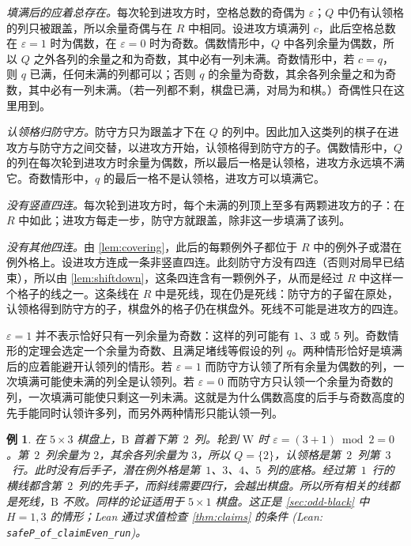 \documentclass[11pt,a4paper]{article}
\makeatletter
\theoremstyle{zhthm}
\newtheorem{example}[theorem]{例}
\renewcommand{\proofname}{证明}
\renewenvironment{proof}[1][\proofname]{\par\pushQED{\qed}\normalfont
  \topsep6\p@\@plus6\p@\relax\trivlist\item[\hskip\labelsep\bfseries #1]\hspace{1em}\ignorespaces}
  {\popQED\endtrivlist\@endpefalse}
\newcommand{\code}[1]{{\upshape\texttt{\small\nolinkurl{#1}}}}
\newcommand{\leanref}[1]{(Lean: \code{#1})}
\newcommand{\B}{\mathrm{B}}
\newcommand{\W}{\mathrm{W}}
\newcommand{\eps}{\varepsilon}
\makeatother
\begin{document}
\begin{proof}
\emph{填满后的应着总存在。}每次轮到进攻方时，空格总数的奇偶为 $\eps$；$Q$ 中仍有认领格的列只被跟盖，所以余量奇偶与在 $R$ 中相同。设进攻方填满列 $c$，此后空格总数在 $\eps=1$ 时为偶数，在 $\eps=0$ 时为奇数。偶数情形中，$Q$ 中各列余量为偶数，所以 $Q$ 之外各列的余量之和为奇数，其中必有一列未满。奇数情形中，若 $c=q$，则 $q$ 已满，任何未满的列都可以；否则 $q$ 的余量为奇数，其余各列余量之和为奇数，其中必有一列未满。（若一列都不剩，棋盘已满，对局为和棋。）奇偶性只在这里用到。

\emph{认领格归防守方。}防守方只为跟盖才下在 $Q$ 的列中。因此加入这类列的棋子在进攻方与防守方之间交替，以进攻方开始，认领格得到防守方的子。偶数情形中，$Q$ 的列在每次轮到进攻方时余量为偶数，所以最后一格是认领格，进攻方永远填不满它。奇数情形中，$q$ 的最后一格不是认领格，进攻方可以填满它。

\emph{没有竖直四连。}每次轮到进攻方时，每个未满的列顶上至多有两颗进攻方的子：在 $R$ 中如此；进攻方每走一步，防守方就跟盖，除非这一步填满了该列。

\emph{没有其他四连。}由 \cref{lem:covering}，此后的每颗例外子都位于 $R$ 中的例外子或潜在例外格上。设进攻方连成一条非竖直四连。此刻防守方没有四连（否则对局早已结束），所以由 \cref{lem:shiftdown}，这条四连含有一颗例外子，从而是经过 $R$ 中这样一个格子的线之一。这条线在 $R$ 中是死线，现在仍是死线：防守方的子留在原处，认领格得到防守方的子，棋盘外的格子仍在棋盘外。死线不可能是进攻方的四连。
\end{proof}

$\eps=1$ 并不表示恰好只有一列余量为奇数：这样的列可能有 $1$、$3$ 或 $5$ 列。奇数情形的定理会选定一个余量为奇数、且满足堵线等假设的列 $q$。两种情形恰好是填满后的应着能避开认领列的情形。若 $\eps=1$ 而防守方认领了所有余量为偶数的列，一次填满可能使未满的列全是认领列。若 $\eps=0$ 而防守方只认领一个余量为奇数的列，一次填满可能使只剩这一列未满。这就是为什么偶数高度的后手与奇数高度的先手能同时认领许多列，而另外两种情形只能认领一列。

\begin{example}
\label{ex:claim-h3}
在 $5\times 3$ 棋盘上，$\B$ 首着下第~$2$~列。轮到 $\W$ 时 $\eps=(3+1)\bmod 2=0$。第~$2$~列余量为 $2$，其余各列余量为 $3$，所以 $Q=\{2\}$，认领格是第~$2$~列第~$3$~行。此时没有后手子，潜在例外格是第~$1$、$3$、$4$、$5$~列的底格。经过第~$1$~行的横线都含第~$2$~列的先手子，而斜线需要四行，会越出棋盘。所以所有相关的线都是死线，$\B$ 不败。同样的论证适用于 $5\times 1$ 棋盘。这正是 \cref{sec:odd-black} 中 $H=1,3$ 的情形；Lean 通过求值检查 \cref{thm:claims} 的条件 \leanref{safeP_of_claimEven_run}。
\end{example}
\end{document}
